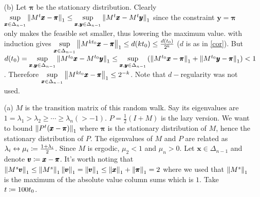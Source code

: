 \begin{enumerate}[leftmargin=*, label=(\alph*)]
\item[(b)] Let $\pmb \pi$ be the stationary distribution. Clearly $\sup\limits_{\pmb x\in \Delta_{n-1}}\left\lVert M^{t}\pmb x-\pmb \pi \right\rVert_{1} \le \sup\limits_{\pmb x,\pmb y\in \Delta_{n-1}}\left\lVert M^{t}\pmb x-M^{t}\pmb y \right\rVert_{1}$ since the constraint $\pmb y=\pmb \pi$ only makes the feasible set smaller, thus lowering the maximum value.  with induction gives $\sup\limits_{\pmb x\in \Delta_{n-1}}\left\lVert M^{kt_{0}}\pmb x-\pmb \pi \right\rVert_{1} \le d(kt_{0}) \le \frac{d(t_{0})}{2^{k}}$ ($d$ is as in \cref{cor}). But $d(t_{0}) = \sup\limits_{\pmb x,\pmb y\in\Delta_{n-1}}\left\lVert M^{t_{0}}\pmb x-M^{t_{0}}\pmb y \right\rVert_{1} \le \sup\limits_{\pmb x,\pmb y\in\Delta_{n-1}}\left(\left\lVert M^{t_{0}}\pmb x -\pmb \pi \right\rVert_{1}+\left\lVert M^{t_{0}}\pmb y-\pmb \pi \right\rVert_{1}\right) <1$. Therefore $\sup\limits_{\pmb x\in \Delta_{n-1}}\left\lVert M^{kt_{0}}\pmb x-\pmb \pi \right\rVert_{1} \le 2^{-k}$. Note that $d-$regularity was not used.
\item[(a)] $M$ is the transition matrix of this random walk. Say its eigenvalues are $1=\lambda_{1} > \lambda_{2} \ge \cdots \ge \lambda_{n} (>-1)$. $P=\frac{1}{2}(I+M)$ is the lazy version. We want to bound $\left\lVert P^{t}(\pmb x-\pmb \pi) \right\rVert_{1}$ where $\pmb \pi$ is the stationary distribution of $M$, hence the stationary distribution of $P$. The eigenvalues of $M$ and $P$ are related as $\lambda_{i} \leftrightarrow \mu_{i}\coloneqq\frac{1+\lambda_{i}}{2}$. Since $M$ is ergodic, $\mu_{2}<1$ and $\mu_{n}>0$. Let $\pmb x\in \Delta_{n-1}$ and denote $\pmb v\coloneqq\pmb x-\pmb \pi$. It's worth noting that $\left\lVert M^{s}\pmb v \right\rVert_{1} \le \left\lVert M^{s} \right\rVert_{1}\left\lVert \pmb v \right\rVert_{1} = \left\lVert \pmb v \right\rVert_{1} \le \left\lVert \pmb x \right\rVert_{1}+\left\lVert \pmb \pi \right\rVert_{1} = 2$ where we used that $\left\lVert M^{s} \right\rVert_{1}$ is the maximum of the absolute value column sums which is $1$. Take $t \coloneqq 100t_{0}$.

\end{enumerate}
